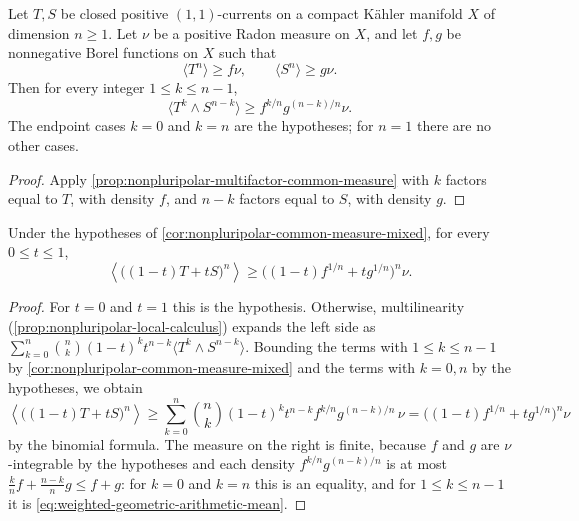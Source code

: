 \begin{corollary}\label{cor:nonpluripolar-common-measure-mixed}
Let $T,S$ be closed positive $(1,1)$-currents on a compact K\"ahler manifold $X$ of dimension $n\geq1$. Let $\nu$ be a positive Radon measure on $X$, and let $f,g$ be nonnegative Borel functions on $X$ such that
\[
 \langle T^n\rangle\geq f\nu,\qquad
 \langle S^n\rangle\geq g\nu.
\]
Then for every integer $1\leq k\leq n-1$,
\[
 \langle T^k\wedge S^{n-k}\rangle
                        \geq f^{k/n}g^{(n-k)/n}\nu.
\]
The endpoint cases $k=0$ and $k=n$ are the hypotheses; for $n=1$ there are no other cases.
\end{corollary}
\begin{proof}
Apply \cref{prop:nonpluripolar-multifactor-common-measure} with $k$ factors equal to $T$, with density $f$, and $n-k$ factors equal to $S$, with density $g$.
\end{proof}

\begin{corollary}\label{cor:nonpluripolar-common-measure-convex}
Under the hypotheses of \cref{cor:nonpluripolar-common-measure-mixed}, for every $0\leq t\leq1$,
\[
 \left\langle\big((1-t)T+tS\big)^n\right\rangle
       \geq\big((1-t)f^{1/n}+tg^{1/n}\big)^n\nu.
\]
\end{corollary}
\begin{proof}
For $t=0$ and $t=1$ this is the hypothesis. Otherwise, multilinearity (\cref{prop:nonpluripolar-local-calculus}) expands the left side as $\sum_{k=0}^n\binom nk(1-t)^kt^{n-k}\langle T^k\wedge S^{n-k}\rangle$. Bounding the terms with $1\leq k\leq n-1$ by \cref{cor:nonpluripolar-common-measure-mixed} and the terms with $k=0,n$ by the hypotheses, we obtain
\[
 \left\langle\big((1-t)T+tS\big)^n\right\rangle\geq\sum_{k=0}^n\binom nk(1-t)^kt^{n-k}f^{k/n}g^{(n-k)/n}\,\nu=\big((1-t)f^{1/n}+tg^{1/n}\big)^n\nu
\]
by the binomial formula. The measure on the right is finite, because $f$ and $g$ are $\nu$-integrable by the hypotheses and each density $f^{k/n}g^{(n-k)/n}$ is at most $\frac knf+\frac{n-k}ng\leq f+g$: for $k=0$ and $k=n$ this is an equality, and for $1\leq k\leq n-1$ it is \eqref{eq:weighted-geometric-arithmetic-mean}.
\end{proof}
